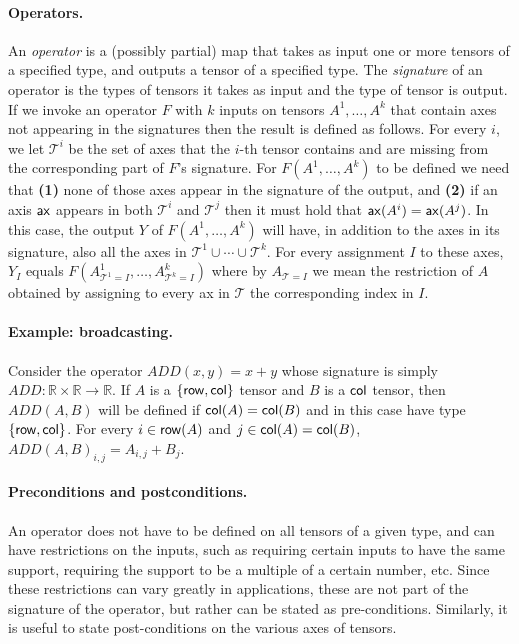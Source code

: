 \documentclass{article}
\begin{document}
\paragraph{Operators.} An \emph{operator}  is a (possibly partial) map that takes as input one or more tensors of a specified type, and outputs a tensor of a specified type.
The \emph{signature} of an operator is the types of tensors it takes as input and the type of tensor is output.
If we invoke an operator $F$ with $k$ inputs on tensors $A^1,\ldots,A^k$  that contain axes not appearing in the signatures then the result is defined as follows.
For every $i$, we let $\mathcal{T}^i$ be the set of axes that the $i$-th tensor contains and are missing from the corresponding part of  $F$'s signature.
For $F(A^1,\ldots,A^k)$ to be defined we need that \textbf{(1)} none of those axes appear in the signature of the output, and \textbf{(2)} if an axis $\mathsf{ax}$ appears in both $\mathcal{T}^i$ and $\mathcal{T}^j$ then it must hold that  $\mathsf{ax}(A^i)=\mathsf{ax}(A^j)$. 
In this case,   the output $Y$ of $F(A^1,\ldots,A^k)$ will have, in addition to the axes in its signature, also all the axes in $\mathcal{T}^1 \cup \cdots \cup \mathcal{T}^k$.
For every assignment $I$ to these axes, $Y_I$ equals $F(A^1_{\mathcal{T}^1=I},\ldots, A^k_{\mathcal{T}^k=I})$ where by $A_{\mathcal{T}=I}$ we mean the restriction of $A$ obtained by assigning to every ax in $\mathcal{T}$ the corresponding index in $I$. 


\paragraph{Example: broadcasting.} Consider the operator $ADD(x,y)=x+y$ whose signature is simply $ADD:\mathbb{R} \times \mathbb{R} \rightarrow \mathbb{R}$.
If $A$ is a $\{ \mathsf{row} , \mathsf{col} \}$ tensor and $B$ is a $\mathsf{col}$ tensor, then $ADD(A,B)$ will be defined if $\mathsf{col}(A)=\mathsf{col}(B)$ and in this case  have type $\{ \mathsf{row}, \mathsf{col} \}$. For every $i \in \mathsf{row}(A)$ and $j\in \mathsf{col}(A)=\mathsf{col}(B)$, $ADD(A,B)_{i,j} = A_{i,j}+B_j$.



\paragraph{Preconditions and postconditions.} An operator does not have to be defined on all tensors of a given type, and can have restrictions on the inputs, such as requiring certain inputs to have the same support, requiring the support to be a multiple of a certain number, etc. Since these restrictions can vary greatly in applications, these are not part of the signature of the operator, but rather can be stated as pre-conditions. Similarly, it is useful to state post-conditions on the various axes of tensors. 
\end{document}
